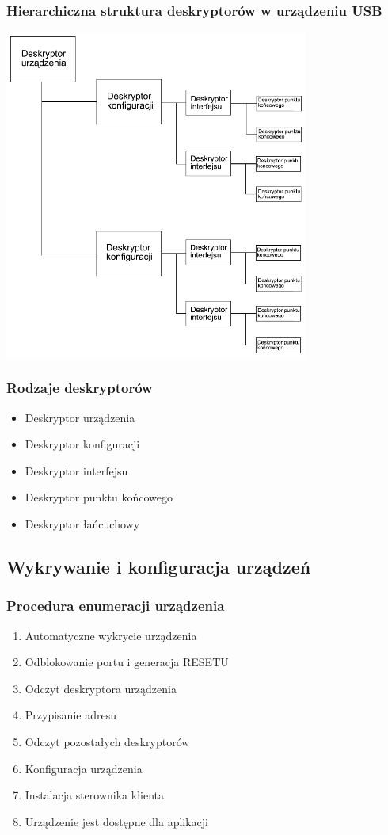 	\subsubsection{Hierarchiczna struktura deskryptorów w urządzeniu USB}
	\includegraphics[width=10cm]{./wyklady/USB_24_1.pdf}
	\subsubsection{Rodzaje deskryptorów}
	\begin{itemize}
		\item Deskryptor urządzenia
		\item Deskryptor konfiguracji
		\item Deskryptor interfejsu
		\item Deskryptor punktu końcowego
		\item Deskryptor łańcuchowy
	\end{itemize}
	
\subsection{Wykrywanie i konfiguracja urządzeń}
	\subsubsection{Procedura enumeracji urządzenia}
	\begin{enumerate}
		\item Automatyczne wykrycie urządzenia
		\item Odblokowanie portu i generacja RESETU
		\item Odczyt deskryptora urządzenia
		\item Przypisanie adresu
		\item Odczyt pozostałych deskryptorów
		\item Konfiguracja urządzenia
		\item Instalacja sterownika klienta
		\item Urządzenie jest dostępne dla aplikacji
	\end{enumerate}
	
